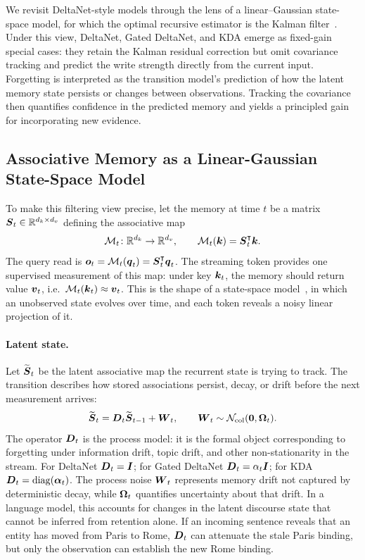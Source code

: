 \documentclass{article} %
\begin{document}
We revisit DeltaNet-style models through the lens of a linear--Gaussian state-space model, for
which the optimal recursive estimator is the Kalman filter~\citep{kalman1960new}. Under this
view, DeltaNet, Gated DeltaNet, and KDA emerge as fixed-gain special cases: they retain the Kalman
residual correction
but omit covariance tracking and predict the write strength directly from the current input.
Forgetting is interpreted as the transition model's prediction of how the latent memory state
persists or changes between observations. Tracking the covariance then quantifies confidence in
the predicted memory and yields a principled gain for incorporating new evidence.

\subsection{Associative Memory as a Linear-Gaussian State-Space Model}
\label{sec:memory-formulation}

To make this filtering view precise, let the memory at time $t$ be a matrix
$\boldsymbol{S}_t\in\mathbb{R}^{d_k\times d_v}$ defining the associative map
\begin{equation}
  \mathcal M_t\colon \mathbb{R}^{d_k}\to\mathbb{R}^{d_v},\qquad \mathcal M_t(\boldsymbol{k})=\boldsymbol{S}_t^{\intercal}\boldsymbol{k} .
  \label{eq:assoc-map}
\end{equation}
The query read is $\boldsymbol{o}_t=\mathcal M_t(\boldsymbol{q}_t)=\boldsymbol{S}_t^{\intercal}\boldsymbol{q}_t$. The streaming token provides one
supervised measurement of this map: under key $\boldsymbol{k}_t$, the memory should return value $\boldsymbol{v}_t$,
i.e.\ $\mathcal M_t(\boldsymbol{k}_t)\approx \boldsymbol{v}_t$. This is the shape of a state-space
model~\citep{gu2023mamba}, in which an unobserved state evolves over time, and each token reveals a
noisy linear projection of it.

\paragraph{Latent state.}
Let $\widetilde{\boldsymbol{S}}_t$ be the latent associative map the recurrent state is trying to track. The
transition describes how stored associations persist, decay, or drift before the next
measurement arrives:
\begin{equation}
  \widetilde{\boldsymbol{S}}_t
  = \boldsymbol{D}_t \widetilde{\boldsymbol{S}}_{t-1} + \boldsymbol{W}_t,
  \qquad
  \boldsymbol{W}_t\sim\mathcal N_{\mathrm{col}}(\boldsymbol{0},\boldsymbol{\Omega}_t).
  \label{eq:mem-update-dynamics}
\end{equation}
The operator $\boldsymbol{D}_t$ is the process model: it is the formal object corresponding to forgetting
under information drift, topic drift, and other non-stationarity in the stream. For DeltaNet
$\boldsymbol{D}_t=\boldsymbol{I}$; for Gated DeltaNet $\boldsymbol{D}_t=\alpha_t \boldsymbol{I}$; for KDA
$\boldsymbol{D}_t=\operatorname{diag}(\boldsymbol{\alpha}_t)$. The process noise $\boldsymbol{W}_t$ represents memory drift not captured
by deterministic decay, while $\boldsymbol{\Omega}_t$ quantifies uncertainty about that drift. In a
language model, this accounts for changes in the latent discourse state that cannot be inferred
from retention alone. If an incoming sentence reveals that an entity has moved from Paris to
Rome, $\boldsymbol{D}_t$ can attenuate the stale Paris binding, but only the observation can establish the
new Rome binding.
\end{document}
